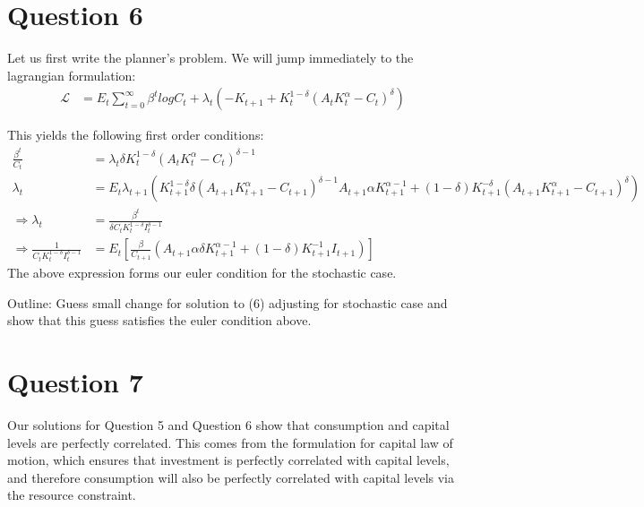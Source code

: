 \documentclass[11pt]{article} %
\begin{document}
\section{Question 6}
Let us first write the planner's problem. We will jump immediately to the lagrangian formulation:
\begin{align*}
\mathcal{L} &= E_t\sum_{t=0}^{\infty} \beta^t log C_t + \lambda_t\left(-K_{t+1}+ K_t^{1-\delta}\left( A_tK_t^{\alpha}  - C_t \right)^{\delta}\right)
\end{align*}

This yields the following first order conditions:
\begin{align*}
\frac{\beta^t}{C_t} &= \lambda_t \delta K_t^{1-\delta}(A_tK_t^{\alpha}  - C_t )^{\delta - 1}\\
\lambda_t &= E_t\lambda_{t+1}(K_{t+1}^{1-\delta}\delta(A_{t+1}K_{t+1}^{\alpha}  - C_{t+1} )^{\delta - 1}A_{t+1}\alpha K_{t+1}^{\alpha - 1} + (1-\delta)K_{t+1}^{-\delta} \left( A_{t+1}K_{t+1}^{\alpha}  - C_{t+1} \right)^{\delta})\\
\Rightarrow \lambda_t &= \frac{\beta^t}{\delta C_tK_t^{1-\delta}I_t^{\delta - 1}} \\
\Rightarrow  \frac{1}{C_tK_t^{1-\delta}I_t^{\delta - 1}}  &=  E_t\left[\frac{\beta}{C_{t+1}}(A_{t+1}\alpha \delta K_{t+1}^{\alpha - 1} + (1-\delta)K_{t+1}^{-1}I_{t+1})\right]
\end{align*}
The above expression forms our euler condition for the stochastic case. 

Outline: Guess small change for solution to (6) adjusting for stochastic case and show that this guess satisfies the euler condition above.

\section{Question 7}
Our solutions for Question 5 and Question 6 show that consumption and capital levels are perfectly correlated. This comes from the formulation for capital law of motion, which ensures that investment is perfectly correlated with capital levels, and therefore consumption will also be perfectly correlated with capital levels via the resource constraint.
\end{document}
